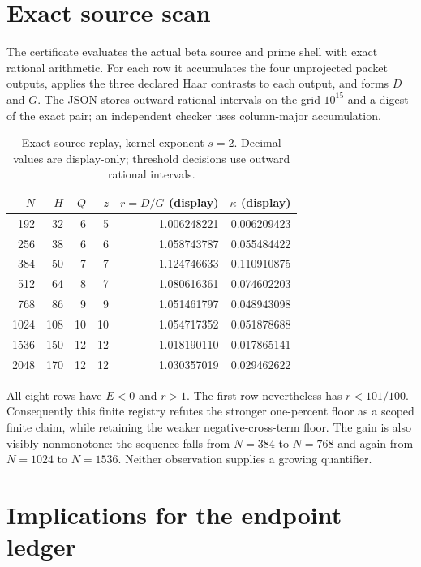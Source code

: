 \documentclass[11pt]{article}
\newcommand{\kappaC}{\kappa}
\begin{document}
\section{Exact source scan}

The certificate evaluates the actual beta source and prime shell with exact
rational arithmetic.  For each row it accumulates the four unprojected
packet outputs, applies the three declared Haar contrasts to each output,
and forms $D$ and $G$.  The JSON stores outward rational intervals on the
grid $10^{15}$ and a digest of the exact pair; an independent checker uses
column-major accumulation.

\begin{table}[t]
\centering
\scriptsize
\begin{tabular}{r r r r r r}
\toprule
$N$ & $H$ & $Q$ & $z$ & $r=D/G$ (display) & $\kappaC$ (display)\\
\midrule
192 & 32 & 6  & 5  & 1.006248221 & 0.006209423\\
256 & 38 & 6  & 6  & 1.058743787 & 0.055484422\\
384 & 50 & 7  & 7  & 1.124746633 & 0.110910875\\
512 & 64 & 8  & 7  & 1.080616361 & 0.074602203\\
768 & 86 & 9  & 9  & 1.051461797 & 0.048943098\\
1024 & 108 & 10 & 10 & 1.054717352 & 0.051878688\\
1536 & 150 & 12 & 12 & 1.018190110 & 0.017865141\\
2048 & 170 & 12 & 12 & 1.030357019 & 0.029462622\\
\bottomrule
\end{tabular}
\caption{Exact source replay, kernel exponent $s=2$.  Decimal values are
display-only; threshold decisions use outward rational intervals.}
\end{table}

All eight rows have $E<0$ and $r>1$.  The first row nevertheless has
$r<101/100$.  Consequently this finite registry refutes the stronger
one-percent floor as a scoped finite claim, while retaining the weaker
negative-cross-term floor.  The gain is also visibly nonmonotone: the
sequence falls from $N=384$ to $N=768$ and again from $N=1024$ to $N=1536$.
Neither observation supplies a growing quantifier.

\section{Implications for the endpoint ledger}
\end{document}
